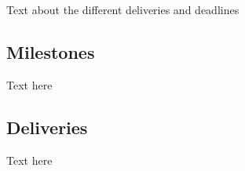 Text about the different deliveries and deadlines


\subsection{Milestones}
Text here

\subsection{Deliveries}
Text here